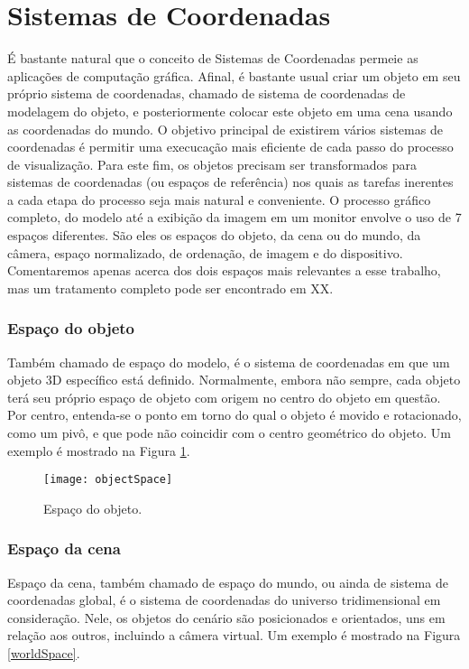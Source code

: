 \section{Sistemas de Coordenadas}

É bastante natural que o conceito de Sistemas de Coordenadas permeie as aplicações de computação gráfica. Afinal, é bastante usual criar um objeto em seu próprio sistema de coordenadas, chamado de sistema de coordenadas de modelagem do objeto, e posteriormente colocar este objeto em uma cena usando as coordenadas do mundo. O objetivo principal de existirem vários sistemas de coordenadas é permitir uma execucação mais eficiente de cada passo do processo de visualização. Para este fim, os objetos precisam ser transformados para sistemas de coordenadas (ou espaços de referência) nos quais as tarefas inerentes a cada etapa do processo seja mais natural e conveniente. O processo gráfico completo, do modelo até a exibição da imagem em um monitor envolve o uso de 7 espaços diferentes. São eles os espaços do objeto, da cena ou do mundo, da câmera, espaço normalizado, de ordenação, de imagem e do dispositivo. Comentaremos apenas acerca dos dois espaços mais relevantes a esse trabalho, mas um tratamento completo pode ser encontrado em XX.

\subsubsection{Espaço do objeto}
Também chamado de espaço do modelo, é o sistema de coordenadas em que um objeto 3D específico está definido. Normalmente, embora não sempre, cada objeto terá seu próprio espaço de objeto com origem no centro do objeto em questão. Por centro, entenda-se o ponto em torno do qual o objeto é movido e rotacionado, como um pivô, e que pode não coincidir com o centro geométrico do objeto. Um exemplo é mostrado na Figura \ref{objectSpace}.

\begin{figure}[!htb]
\center
\texttt{[image: objectSpace]}
\caption{Espaço do objeto.}
\label{objectSpace}
\end{figure}

\subsubsection{Espaço da cena}
Espaço da cena, também chamado de espaço do mundo, ou ainda de sistema de coordenadas global, é o sistema de coordenadas do universo tridimensional em consideração. Nele, os objetos do cenário são posicionados e orientados, uns em relação aos outros, incluindo a câmera virtual. Um exemplo é mostrado na Figura \ref{worldSpace}.


